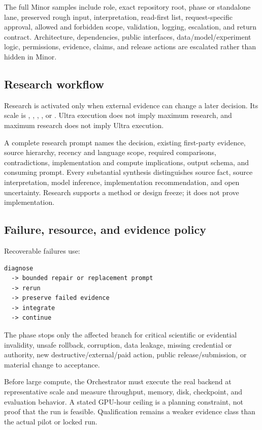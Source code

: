 \documentclass[11pt,a4paper]{article}
\newcommand{\code}[1]{\texttt{\detokenize{#1}}}
\begin{document}
The full Minor samples include role, exact repository root, phase or standalone lane, preserved rough
input, interpretation, read-first list, request-specific approval, allowed and forbidden scope,
validation, logging, escalation, and return contract. Architecture, dependencies, public interfaces,
data/model/experiment logic, permissions, evidence, claims, and release actions are escalated rather
than hidden in Minor.

\subsection{Research workflow}\label{sec:research-workflow}

Research is activated only when external evidence can change a later decision. Its scale is
\code{none}, \code{low}, \code{mid}, \code{high}, or \code{max}. Ultra execution does not imply
maximum research, and maximum research does not imply Ultra execution.

A complete research prompt names the decision, existing first-party evidence, source hierarchy,
recency and language scope, required comparisons, contradictions, implementation and compute
implications, output schema, and consuming prompt. Every substantial synthesis distinguishes source
fact, source interpretation, model inference, implementation recommendation, and open uncertainty.
Research supports a method or design freeze; it does not prove implementation.

\subsection{Failure, resource, and evidence policy}

Recoverable failures use:

\begin{lstlisting}[style=workflow]
diagnose
  -> bounded repair or replacement prompt
  -> rerun
  -> preserve failed evidence
  -> integrate
  -> continue
\end{lstlisting}

The phase stops only the affected branch for critical scientific or evidential invalidity, unsafe
rollback, corruption, data leakage, missing credential or authority, new destructive/external/paid
action, public release/submission, or material change to acceptance.

Before large compute, the Orchestrator must execute the real backend at representative scale and
measure throughput, memory, disk, checkpoint, and evaluation behavior. A stated GPU-hour ceiling is
a planning constraint, not proof that the run is feasible. Qualification remains a weaker evidence
class than the actual pilot or locked run.
\end{document}
